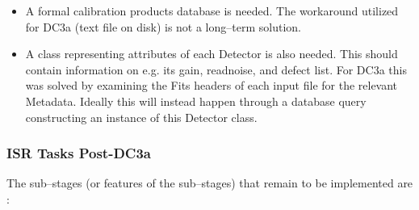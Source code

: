 \begin{itemize}
\item A formal calibration products database is needed.  The workaround 
utilized for DC3a (text file on disk) is not a long--term solution.

\item A class representing attributes of each Detector is also needed.  
This should contain information on e.g. its gain, readnoise, and
defect list.  For DC3a this was solved by examining the Fits headers of
each input file for the relevant Metadata.  Ideally this will instead
happen through a database query constructing an instance of this
Detector class.


\end{itemize}

\subsubsection{ISR Tasks Post-DC3a}

The sub--stages (or features of the sub--stages) that remain to be
implemented are :

